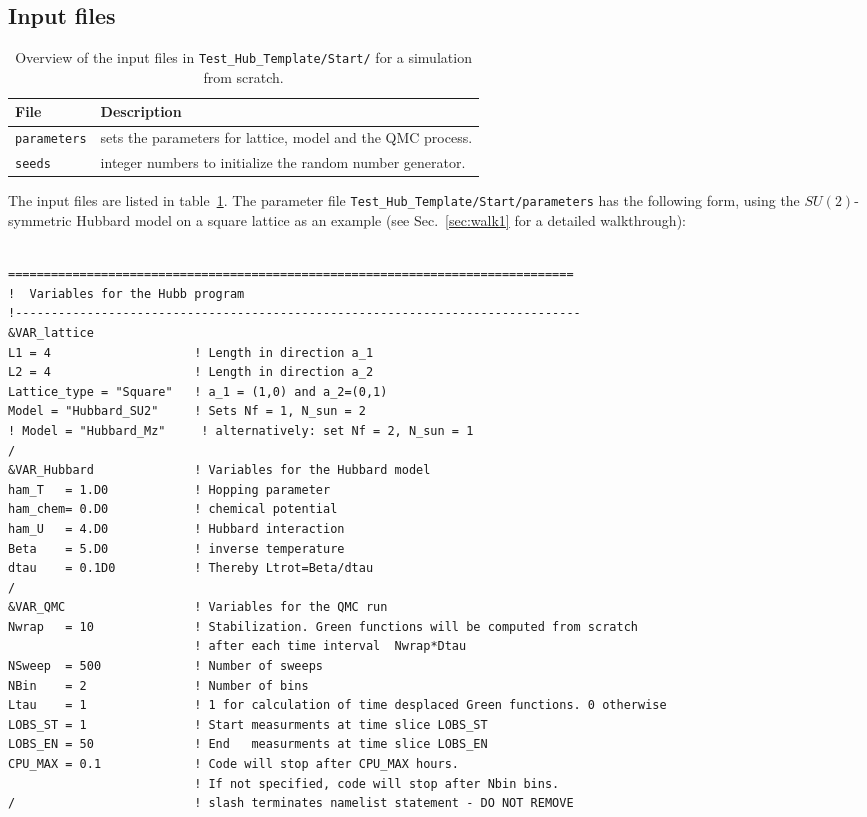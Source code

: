 \subsection{Input files}\label{sec:input}
%
\begin{table}[h]
   \begin{tabular}{l l}
   File & Description \\\hline
  \texttt{parameters} &  sets the parameters for lattice, model and the QMC process.\\
  \texttt{seeds} & integer numbers to initialize the random number generator.
   \end{tabular}
   \caption{Overview of the input files in \texttt{Test\_Hub\_Template/Start/} for a simulation from scratch. \label{table:input}}
\end{table}
%
The input files are listed in table~\ref{table:input}. 
The parameter file \texttt{Test\_Hub\_Template/Start/parameters} has the following form, 
using the $SU(2)$-symmetric Hubbard model on a square lattice as an example (see Sec.~\ref{sec:walk1} for a detailed walkthrough):
%
\begin{lstlisting} 

===============================================================================
!  Variables for the Hubb program
!-------------------------------------------------------------------------------
&VAR_lattice
L1 = 4                    ! Length in direction a_1
L2 = 4                    ! Length in direction a_2
Lattice_type = "Square"	  ! a_1 = (1,0) and a_2=(0,1)
Model = "Hubbard_SU2"     ! Sets Nf = 1, N_sun = 2
! Model = "Hubbard_Mz"     ! alternatively: set Nf = 2, N_sun = 1
/
&VAR_Hubbard              ! Variables for the Hubbard model
ham_T   = 1.D0            ! Hopping parameter
ham_chem= 0.D0            ! chemical potential
ham_U   = 4.D0            ! Hubbard interaction
Beta    = 5.D0            ! inverse temperature
dtau    = 0.1D0           ! Thereby Ltrot=Beta/dtau
/
&VAR_QMC                  ! Variables for the QMC run
Nwrap   = 10              ! Stabilization. Green functions will be computed from scratch 
                          ! after each time interval  Nwrap*Dtau
NSweep  = 500             ! Number of sweeps
NBin    = 2               ! Number of bins
Ltau    = 1               ! 1 for calculation of time desplaced Green functions. 0 otherwise
LOBS_ST = 1               ! Start measurments at time slice LOBS_ST
LOBS_EN = 50              ! End   measurments at time slice LOBS_EN
CPU_MAX = 0.1             ! Code will stop after CPU_MAX hours. 
                          ! If not specified, code will stop after Nbin bins.
/                         ! slash terminates namelist statement - DO NOT REMOVE
\end{lstlisting}
%
